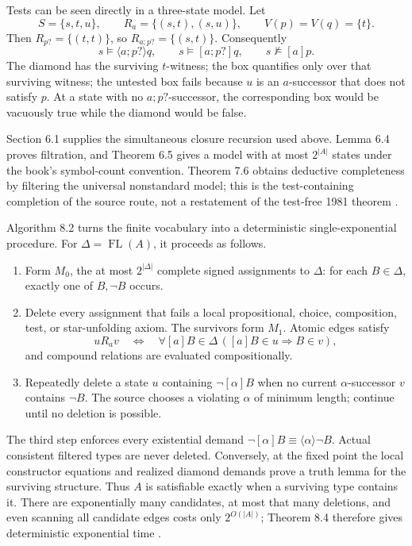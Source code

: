 Tests can be seen directly in a three-state model.  Let
\[
 S=\{s,t,u\},\qquad
 R_a=\{(s,t),(s,u)\},\qquad
 V(p)=V(q)=\{t\}.
\]
Then \(R_{p?}=\{(t,t)\}\), so
\(R_{a;p?}=\{(s,t)\}\).  Consequently
\[
 s\models\langle a;p?\rangle q,
 \qquad
 s\models[a;p?]q,
 \qquad
 s\not\models[a]p.
\]
The diamond has the surviving \(t\)-witness; the box quantifies only over that
surviving witness; the untested box fails because \(u\) is an \(a\)-successor
that does not satisfy \(p\).  At a state with no
\(a;p?\)-successor, the corresponding box would be vacuously true while the
diamond would be false.

Section 6.1 supplies the simultaneous closure recursion used above.  Lemma 6.4
proves filtration, and Theorem 6.5 gives a model with at most \(2^{|A|}\) states
under the book's symbol-count convention.  Theorem 7.6 obtains deductive
completeness by filtering the universal nonstandard model; this is the
test-containing completion of the source route, not a restatement of the
test-free 1981 theorem \cite[\S\S6.1--6.2,7.1]{HarelKozenTiuryn2000}.

Algorithm 8.2 turns the finite vocabulary into a deterministic
single-exponential procedure.  For \(\Delta=\operatorname{FL}(A)\), it proceeds
as follows.
\begin{enumerate}
\item Form \(M_0\), the at most \(2^{|\Delta|}\) complete signed assignments to
  \(\Delta\): for each \(B\in\Delta\), exactly one of \(B,\neg B\) occurs.
\item Delete every assignment that fails a local propositional, choice,
  composition, test, or star-unfolding axiom.  The survivors form \(M_1\).
  Atomic edges satisfy
  \[
   uR_av
   \quad\Longleftrightarrow\quad
   \forall[a]B\in\Delta\,([a]B\in u\Longrightarrow B\in v),
  \]
  and compound relations are evaluated compositionally.
\item Repeatedly delete a state \(u\) containing
  \(\neg[\alpha]B\) when no current \(\alpha\)-successor \(v\) contains
  \(\neg B\).  The source chooses a violating \(\alpha\) of minimum length;
  continue until no deletion is possible.
\end{enumerate}
The third step enforces every existential demand
\(\neg[\alpha]B\equiv\langle\alpha\rangle\neg B\).  Actual consistent
filtered types are never deleted.  Conversely, at the fixed point the local
constructor equations and realized diamond demands prove a truth lemma for
the surviving structure.  Thus \(A\) is satisfiable exactly when a surviving
type contains it.  There are exponentially many candidates, at most that many
deletions, and even scanning all candidate edges costs only
\(2^{O(|A|)}\); Theorem 8.4 therefore gives deterministic exponential time
\cite[\S8.1]{HarelKozenTiuryn2000}.

